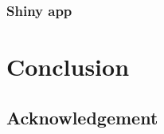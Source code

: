 \documentclass[article,nojss]{jss}
\begin{document}
\lipsum[2]

\hypertarget{shiny-app}{%
\subsubsection{Shiny app}\label{shiny-app}}

\lipsum[2]

\hypertarget{conclusion}{%
\section{Conclusion}\label{conclusion}}

\lipsum[2]

\hypertarget{acknowledgement}{%
\subsection{Acknowledgement}\label{acknowledgement}}

\lipsum[2]


\end{document}
